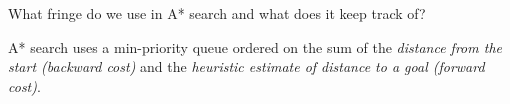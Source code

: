 \question What fringe do we use in A* search and what does it keep track of?

\begin{solution}[0.5in]
A* search uses a min-priority queue ordered on the sum of the \emph{distance
from the start (backward cost)} and the \emph{heuristic estimate of distance to
a goal (forward cost)}.
\end{solution}
